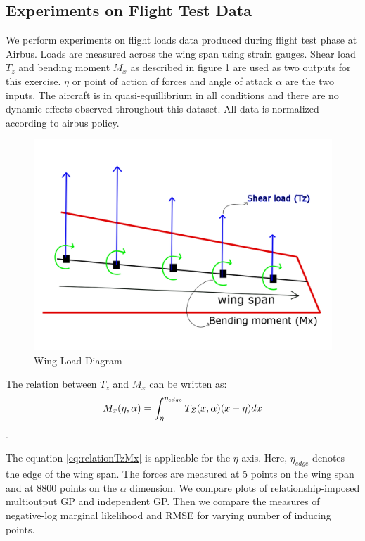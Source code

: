 \subsection{Experiments on Flight Test Data}\label{subsec:expFlightLoadsData}
We perform experiments on flight loads data produced during flight test phase at Airbus. Loads are measured across the wing span using strain gauges. Shear load \(T_{z}\) and bending moment \(M_{x}\) as described in figure \ref{fig:wingLoadDiagram} are used as two outputs for this exercise. \(\eta\) or point of action of forces and angle of attack \(\alpha\) are the two inputs. The aircraft is in quasi-equillibrium in all conditions and there are no dynamic effects observed throughout this dataset. All data is normalized according to airbus policy.

\begin{figure}
\centering
\includegraphics[width=0.5\columnwidth]{images/part3/wingLoadDiagram.png}
\caption{Wing Load Diagram}
\label{fig:wingLoadDiagram}
\end{figure}


The relation between \(T_{z}\) and \(M_{x}\) can be written as:
\begin{equation}\label{eq:relationTzMx}
\centering
M_{x}(\eta, \alpha) = \int_{\eta}^{\eta_{edge}} T_{Z}(x, \alpha)(x-\eta)dx
\end{equation}.


The equation \ref{eq:relationTzMx} is applicable for the \(\eta\) axis. Here, \(\eta_{edge}\) denotes the edge of the wing span. The forces are measured at 5 points on the wing span and at 8800 points on the \(\alpha\) dimension. We compare plots of relationship-imposed multioutput GP and independent GP. Then we compare the measures of negative-log marginal likelihood and RMSE for varying number of inducing points.

